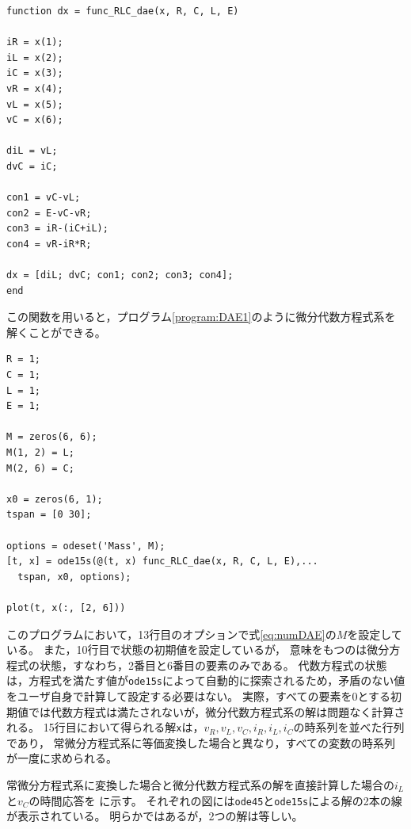 \documentclass[tombow,dvipdfmx]{corona-a5-1.1}
\begin{document}
\begin{例}[簡単な微分代数方程式系の数値解法]
\smallskip
\begin{PROGRAMA}[count,title={func\_RLC\_dae.m}]\label{program:func_DAE1}
\begin{verbatim}
function dx = func_RLC_dae(x, R, C, L, E)

iR = x(1);
iL = x(2);
iC = x(3);
vR = x(4);
vL = x(5);
vC = x(6);

diL = vL;
dvC = iC;

con1 = vC-vL;
con2 = E-vC-vR;
con3 = iR-(iC+iL);
con4 = vR-iR*R;

dx = [diL; dvC; con1; con2; con3; con4];
end
\end{verbatim}
\end{PROGRAMA}
この関数を用いると，プログラム\nobreak\ref{program:DAE1}のように微分代数方程式系を解くことができる。

\smallskip
\begin{PROGRAMA}[count,title={main\_RLC\_dae.m}]\label{program:DAE1}
\begin{verbatim}
R = 1;
C = 1;
L = 1;
E = 1;

M = zeros(6, 6);
M(1, 2) = L;
M(2, 6) = C;

x0 = zeros(6, 1);
tspan = [0 30];

options = odeset('Mass', M);
[t, x] = ode15s(@(t, x) func_RLC_dae(x, R, C, L, E),...
  tspan, x0, options);

plot(t, x(:, [2, 6]))
\end{verbatim}
\end{PROGRAMA}


このプログラムにおいて，13行目のオプションで式\ref{eq:numDAE}の$M$を設定している。
また，10行目で状態の初期値を設定しているが，
意味をもつのは微分方程式の状態，すなわち，2番目と6番目の要素のみである。
代数方程式の状態は，方程式を満たす値が\verb|ode15s|によって自動的に探索されるため，矛盾のない値をユーザ自身で計算して設定する必要はない。
実際，すべての要素を$0$とする初期値では代数方程式は満たされないが，微分代数方程式系の解は問題なく計算される。
15行目において得られる解\verb|x|は，$v_R, v_L, v_C, i_R, i_L, i_C$の時系列を並べた行列であり，
常微分方程式系に等価変換した場合と異なり，すべての変数の時系列が一度に求められる。

常微分方程式系に変換した場合と微分代数方程式系の解を直接計算した場合の$i_L$と$v_C$の時間応答を
に示す。
それぞれの図には\verb|ode45|と\verb|ode15s|による解の2本の線が表示されている。
明らかではあるが，2つの解は等しい。



\end{例}
\end{document}
